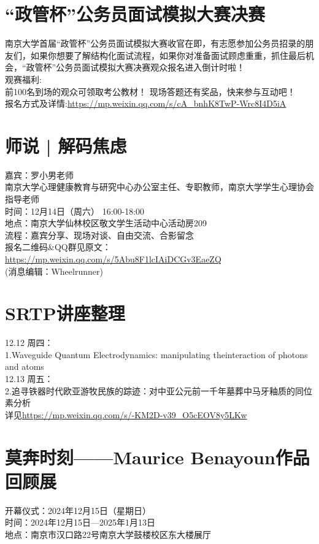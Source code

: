 \documentclass[letterpaper, 12pt]{article}
\begin{document}
\begin{multicols}{2}
\section{“政管杯”公务员面试模拟大赛决赛}
南京大学首届“政管杯”公务员面试模拟大赛收官在即，有志愿参加公务员招录的朋友们，如果你想要了解结构化面试流程，如果你对准备面试顾虑重重，抓住最后机会，“政管杯”公务员面试模拟大赛决赛观众报名进入倒计时啦！\\
观赛福利:\\
前100名到场的观众可领取考公教材！
现场答题还有奖品，快来参与互动吧！\\
报名方式及详情:\url{https://mp.weixin.qq.com/s/cA_bnhK8TwP-Wrc8I4D5iA}\\

\section{师说 | 解码焦虑}
嘉宾：罗小男老师\\
南京大学心理健康教育与研究中心办公室主任、专职教师，南京大学学生心理协会指导老师\\
时间：12月14日（周六） 16:00-18:00\\
地点：南京大学仙林校区敬文学生活动中心活动房209\\
流程：嘉宾分享、现场对谈、自由交流、合影留念\\
报名二维码\&QQ群见原文：\url{https://mp.weixin.qq.com/s/5Abu8F1lcIAiDCGv3EaeZQ}\\
(消息编辑：Wheelrunner)

\section{SRTP讲座整理}
12.12 周四：\\
1.Waveguide Quantum Electrodynamics: manipulating theinteraction of photons and atoms\\
12.13 周五：\\
2.追寻铁器时代欧亚游牧民族的踪迹：对中亚公元前一千年墓葬中马牙釉质的同位素分析\\
详见\url{https://mp.weixin.qq.com/s/-KM2D-v39_O5cEOV8y5LKw}

\section{莫奔时刻——Maurice Benayoun作品回顾展}
开幕仪式：2024年12月15日（星期日）\\
时间：2024年12月15日—2025年1月13日\\
地点：南京市汉口路22号南京大学鼓楼校区东大楼展厅\\


\end{multicols}
\end{document}
